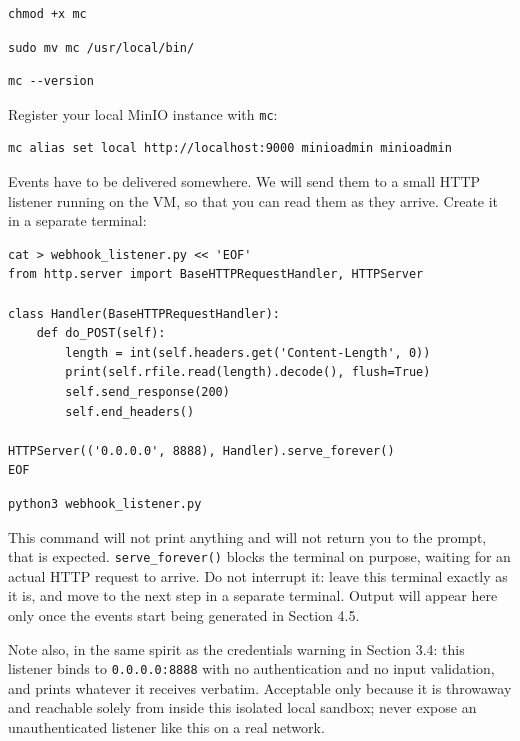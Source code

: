 \begin{lstlisting}
chmod +x mc
\end{lstlisting}
\begin{lstlisting}
sudo mv mc /usr/local/bin/
\end{lstlisting}
\begin{lstlisting}
mc --version
\end{lstlisting}

\noindent
Register your local MinIO instance with \texttt{mc}:
\begin{lstlisting}
mc alias set local http://localhost:9000 minioadmin minioadmin
\end{lstlisting}

\noindent
Events have to be delivered somewhere. We will send them to a small HTTP listener running on the
VM, so that you can read them as they arrive. Create it in a separate terminal:

\begin{lstlisting}
cat > webhook_listener.py << 'EOF'
from http.server import BaseHTTPRequestHandler, HTTPServer

class Handler(BaseHTTPRequestHandler):
    def do_POST(self):
        length = int(self.headers.get('Content-Length', 0))
        print(self.rfile.read(length).decode(), flush=True)
        self.send_response(200)
        self.end_headers()

HTTPServer(('0.0.0.0', 8888), Handler).serve_forever()
EOF
\end{lstlisting}
\begin{lstlisting}
python3 webhook_listener.py
\end{lstlisting}

\begin{warningbox}
This command will not print anything and will not return you to the prompt, that is expected.
\texttt{serve\_forever()} blocks the terminal on purpose, waiting for an actual HTTP request to
arrive. Do not interrupt it: leave this terminal exactly as it is, and move to the next step in a
separate terminal. Output will appear here only once the events start being generated in Section
4.5.
\medskip

\noindent
Note also, in the same spirit as the credentials warning in Section 3.4: this listener binds to
\texttt{0.0.0.0:8888} with no authentication and no input validation, and prints whatever it
receives verbatim. Acceptable only because it is throwaway and reachable solely from inside this
isolated local sandbox; never expose an unauthenticated listener like this on a real network.
\end{warningbox}

